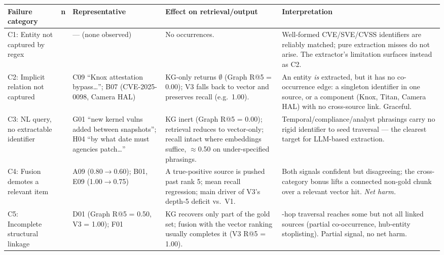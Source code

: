 \documentclass[
]{article}
\newcounter{none} %
\begin{document}
{\def\LTcaptype{none}
\begin{longtable}[]{@{}
  >{\raggedright\arraybackslash}p{}
  >{\centering\arraybackslash}p{}
  >{\raggedright\arraybackslash}p{}
  >{\raggedright\arraybackslash}p{}
  >{\raggedright\arraybackslash}p{}@{}}
\toprule\noalign{}
\textbf{Failure category} & \textbf{n} & \textbf{Representative} & \textbf{Effect on retrieval/output} & \textbf{Interpretation} \\
\midrule\noalign{}
\endhead
\bottomrule\noalign{}
\endlastfoot
C1: Entity not captured by regex & 0 & --- (none observed) & No occurrences. & Well-formed CVE/SVE/CVSS identifiers are reliably matched; pure extraction misses do not arise. The extractor's limitation surfaces instead as C2. \\
C2: Implicit relation not captured & 19 & C09 ``Knox attestation bypass\ldots''; B07 (CVE-2025-0098, Camera HAL) & KG-only returns $\emptyset$ (Graph R@5 = 0.00); V3 falls back to vector and preserves recall (e.g.\ 1.00). & An entity \emph{is} extracted, but it has no co-occurrence edge: a singleton identifier in one source, or a component (Knox, Titan, Camera HAL) with no cross-source link. Graceful. \\
C3: NL query, no extractable identifier & 11 & G01 ``new kernel vulns added between snapshots''; H04 ``by what date must agencies patch\ldots'' & KG inert (Graph R@5 = 0.00); retrieval reduces to vector-only; recall intact where embeddings suffice, $\approx$0.50 on under-specified phrasings. & Temporal/compliance/analyst phrasings carry no rigid identifier to seed traversal --- the clearest target for LLM-based extraction. \\
C4: Fusion demotes a relevant item & 13 & A09 (0.80$\to$0.60); B01, E09 (1.00$\to$0.75) & A true-positive source is pushed past rank 5; mean recall regression; main driver of V3's depth-5 deficit vs.\ V1. & Both signals confident but disagreeing; the cross-category bonus lifts a connected non-gold chunk over a relevant vector hit. \emph{Net harm.} \\
C5: Incomplete structural linkage & 11 & D01 (Graph R@5 = 0.50, V3 = 1.00); F01 & KG recovers only part of the gold set; fusion with the vector ranking usually completes it (V3 R@5 = 1.00). & 2-hop traversal reaches some but not all linked sources (partial co-occurrence, hub-entity stoplisting). Partial signal, no net harm. \\
\end{longtable}
}
\end{document}
